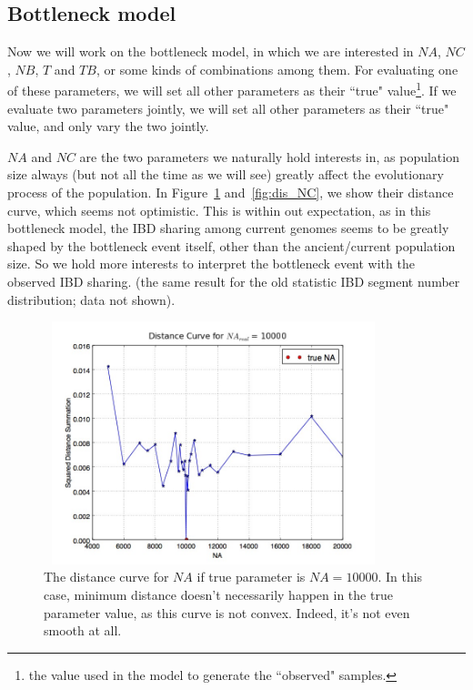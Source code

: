\documentclass{bioinfo}
\begin{document}
\subsection{Bottleneck model}

Now we will work on the bottleneck model, in which we are interested in $NA$, $NC$, $NB$, $T$ and $TB$, or some kinds of combinations among them. For evaluating one of these parameters, we will set all other parameters as their ``true" value\footnote{the value used in the model to generate the ``observed" samples.}. If we evaluate two parameters jointly, we will set all other parameters as their ``true" value, and only vary the two jointly.

$NA$ and $NC$ are the two parameters we naturally hold interests in, as population size always (but not all the time as we will see) greatly affect the evolutionary process of the population. In Figure~\ref{fig:dis_NA} and~\ref{fig:dis_NC}, we show their distance curve, which seems not optimistic. This is within out expectation, as in this bottleneck model, the IBD sharing among current genomes seems to be greatly shaped by the bottleneck event itself, other than the ancient/current population size. So we hold more interests to interpret the bottleneck event with the observed IBD sharing. (the same result for the old statistic IBD segment number distribution; data not shown).

\begin{figure}[h]
\centerline{\includegraphics[width=280pt, height=200pt]{like_NA.jpg}}
\caption{The distance curve for $NA$ if true parameter is $NA=10000$. In this case, minimum distance doesn't necessarily happen in the true parameter value, as this curve is not convex. Indeed, it's not even smooth at all.}\label{fig:dis_NA}
\end{figure}
\end{document}
